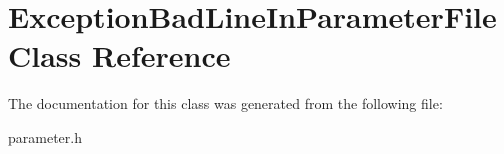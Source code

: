 \hypertarget{classExceptionBadLineInParameterFile}{}\section{Exception\+Bad\+Line\+In\+Parameter\+File Class Reference}
\label{classExceptionBadLineInParameterFile}


The documentation for this class was generated from the following file\+:\begin{DoxyCompactItemize}
\item 
parameter.\+h\end{DoxyCompactItemize}
